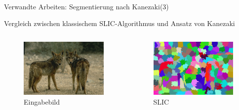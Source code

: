 \documentclass[9pt]{beamer}
\begin{document}
\begin{frame}{Verwandte Arbeiten: Segmentierung nach Kanezaki\footnotemark[1] (3)}
\begin{center}
	Vergleich zwischen klassischem SLIC-Algorithmus und Ansatz von Kanezaki
\end{center}
\begin{columns}
	\begin{column}{.33\textwidth}
		\begin{figure}
			\includegraphics[width=\textwidth,keepaspectratio]{196062.jpg}
			\caption{Eingabebild}
		\end{figure}
	\end{column}
	\begin{column}{.33\textwidth}
		\begin{figure}
			\includegraphics[width=\textwidth,keepaspectratio]{slic.png}
			\caption{SLIC}
		\end{figure}

\end{column}
\end{columns}
\end{frame}
\end{document}
